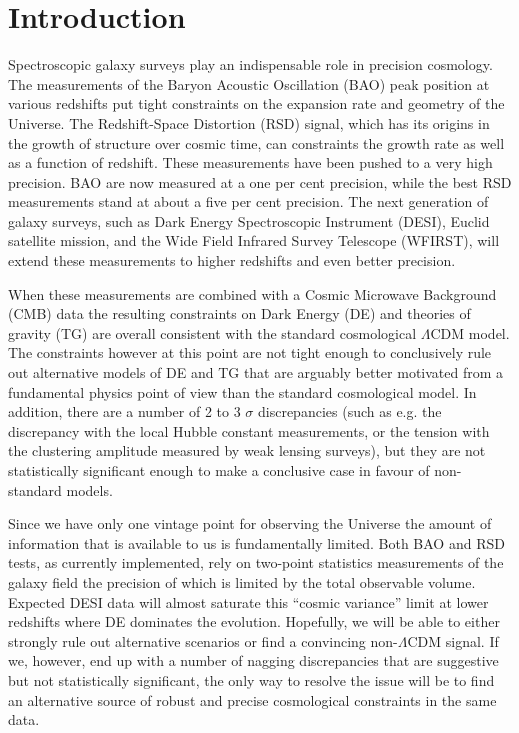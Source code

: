 


\section{Introduction} %
Spectroscopic galaxy surveys play an indispensable role in precision cosmology.
The measurements of the Baryon Acoustic Oscillation (BAO) peak position at
various redshifts put tight constraints on the expansion rate and geometry of
the Universe. The Redshift-Space Distortion (RSD) signal, which has its origins
in the growth of structure over cosmic time, can constraints the growth rate as
well as a function of redshift. These measurements have been
pushed to a very high precision. BAO are now measured at a one per cent
precision,  while the best RSD measurements stand at about a five per cent
precision. The next generation of galaxy surveys, such as Dark Energy
Spectroscopic Instrument (DESI), Euclid satellite mission, and the Wide Field
Infrared Survey Telescope (WFIRST), will extend these measurements to higher
redshifts and even better precision.

When these measurements are combined with a Cosmic Microwave Background (CMB)
data the resulting constraints on Dark Energy (DE) and theories of gravity
(TG) are overall consistent with the standard cosmological $\Lambda$CDM model.
The constraints however at this point are not tight enough to conclusively rule
out alternative models of DE and TG that are arguably better motivated from a
fundamental physics point of view than the standard cosmological model. In
addition, there are a number of 2 to 3 $\sigma$ discrepancies (such as e.g.
the discrepancy with the local Hubble constant measurements, or the tension
with the clustering amplitude measured by weak lensing surveys), but they are
not statistically significant enough to make a conclusive case in favour of
non-standard models.
 
Since we have only one vintage point for observing the Universe the amount of
information that is  available to us is fundamentally limited. Both BAO and RSD
tests, as currently implemented, rely on two-point statistics measurements of
the galaxy field the precision of which is limited by the total  observable
volume.  Expected DESI data will almost saturate this ``cosmic variance'' limit
at lower redshifts where DE dominates the evolution. Hopefully, we will be able
to either strongly rule out alternative scenarios or find a convincing
non-$\Lambda$CDM signal. If we, however, end up with a number of nagging
discrepancies that are suggestive but not statistically significant, the only
way to resolve the issue will be to find an alternative source of robust and
precise cosmological constraints in the same data.

